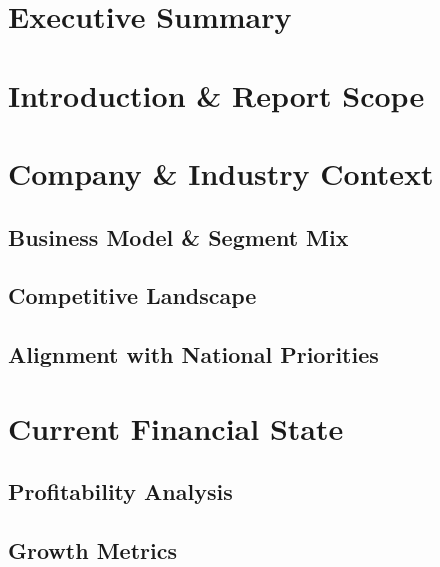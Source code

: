 \documentclass[12pt]{report}
\begin{document}
\section{Executive Summary}
\lipsum[1]

\section{Introduction \& Report Scope}
\lipsum[2]

\section{Company \& Industry Context}
\subsection{Business Model \& Segment Mix}
\lipsum[3]

\subsection{Competitive Landscape}
\lipsum[4]

\subsection{Alignment with National Priorities}
\lipsum[5]

\section{Current Financial State}
\subsection{Profitability Analysis}
\lipsum[6]

\subsection{Growth Metrics}
\lipsum[7]
\end{document}
